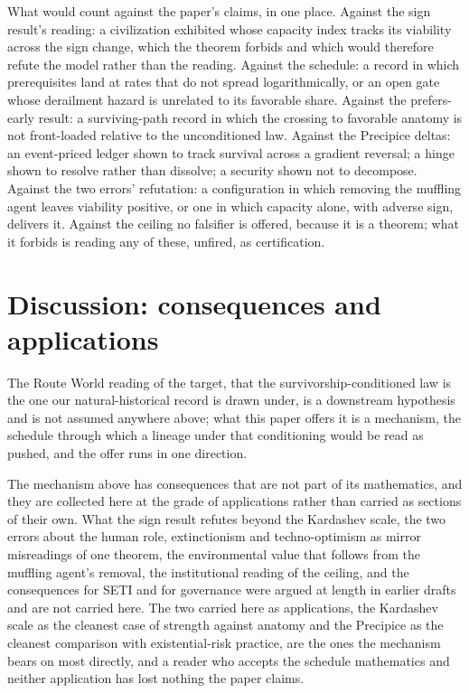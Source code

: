 What would count against the paper's claims, in one place. Against the
sign result's reading: a civilization exhibited whose capacity index
tracks its viability across the sign change, which the theorem forbids
and which would therefore refute the model rather than the reading.
Against the schedule: a record in which prerequisites land at rates
that do not spread logarithmically, or an open gate whose derailment
hazard is unrelated to its favorable share. Against the prefers-early
result: a surviving-path record in which the crossing to favorable
anatomy is not front-loaded relative to the unconditioned law. Against
the Precipice deltas: an event-priced ledger shown to track survival
across a gradient reversal; a hinge shown to resolve rather than
dissolve; a security shown not to decompose. Against the two errors'
refutation: a configuration in which removing the muffling agent leaves
viability positive, or one in which capacity alone, with adverse sign,
delivers it. Against the ceiling no falsifier is offered, because it is a
theorem; what it forbids is reading any of these, unfired, as
certification.

\section{Discussion: consequences and applications}\label{sec:discussion}

The Route World reading of the target, that the survivorship-conditioned
law is the one our natural-historical record is drawn under, is a
downstream hypothesis and is not assumed anywhere above; what this
paper offers it is a mechanism, the schedule through which a lineage
under that conditioning would be read as pushed, and the offer runs in
one direction.

The mechanism above has consequences that are not part of its
mathematics, and they are collected here at the grade of applications
rather than carried as sections of their own. What the sign result
refutes beyond the Kardashev scale, the two errors about the human role,
extinctionism and techno-optimism as mirror misreadings of one theorem,
the environmental value that follows from the muffling agent's removal,
the institutional reading of the ceiling, and the consequences for SETI
and for governance were argued at length in earlier drafts and are
not carried here. The two carried
here as applications, the Kardashev scale as the cleanest case of
strength against anatomy and the Precipice as the cleanest comparison
with existential-risk practice, are the ones the mechanism bears on most
directly, and a reader who accepts the schedule mathematics and neither
application has lost nothing the paper claims.

